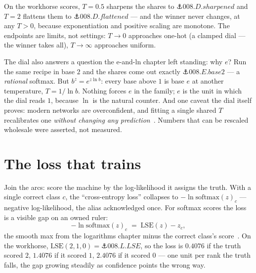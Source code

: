 \begin{narrative}
On the workhorse scores, $T = 0.5$ sharpens the shares to
$\anchor{008.D.sharpened}$ and $T = 2$ flattens them to
$\anchor{008.D.flattened}$ — and the winner never changes, at any
$T > 0$, because exponentiation and positive scaling are monotone.
The endpoints are limits, not settings: $T \to 0$ approaches one-hot
(a clamped dial — the winner takes all), $T \to \infty$ approaches
uniform.

The dial also answers a question the e-and-ln chapter left standing:
why $e$? Run the same recipe in base $2$ and the shares come out
exactly $\anchor{008.E.base2}$ — a \emph{rational} softmax. But
$b^z = e^{z \ln b}$: every base above $1$ is base $e$ at another
temperature, $T = 1/\ln b$. Nothing forces $e$ in the family; $e$ is
the unit in which the dial reads $1$, because $\ln$ is the natural
counter. And one caveat the dial itself proves: modern networks are
overconfident, and fitting a single shared $T$ recalibrates one
\emph{without changing any
prediction}~\cite{probability-guo-pleiss-sun-and-weinberger-on-calibration-of-modern-neura}.
Numbers that can be rescaled wholesale were asserted, not measured.

\section{The loss that trains}

Join the arcs: score the machine by the log-likelihood it assigns the
truth. With a single correct class $c$, the ``cross-entropy loss''
collapses to $-\ln \mathrm{softmax}(z)_c$ — negative log-likelihood,
the alias acknowledged once. For softmax scores the loss is a visible
gap on an owned ruler:
\[
  -\ln \mathrm{softmax}(z)_c \;=\; \mathrm{LSE}(z) - z_c ,
\]
the smooth max from the logarithms chapter minus the correct class's
score~\cite{probability-ian-goodfellow-yoshua-bengio-and-aaron-courville-deep-learni}.
On the workhorse, $\mathrm{LSE}(2,1,0) = \anchor{008.L.LSE}$, so the
loss is $0.4076$ if the truth scored $2$, $1.4076$ if it scored $1$,
$2.4076$ if it scored $0$ — one unit per rank the truth falls, the
gap growing steadily as confidence points the wrong way.


\end{narrative}
